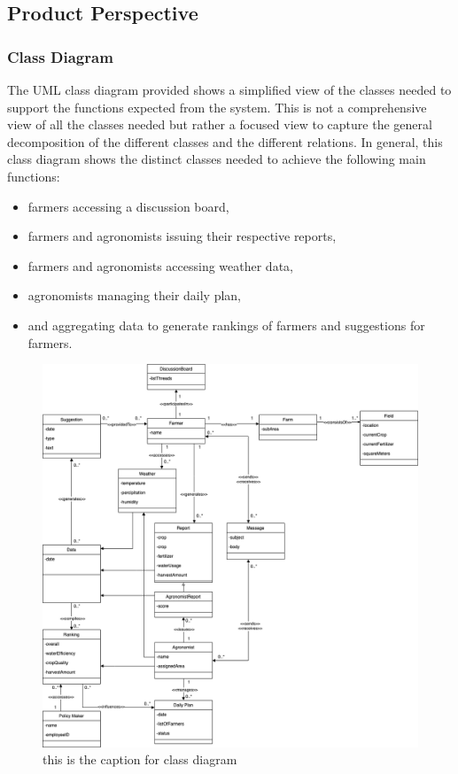 
\subsection{Product Perspective}

\subsubsection{Class Diagram}
The UML class diagram provided shows a simplified view of the classes needed to support the functions expected from the system. This is not a comprehensive view of all the classes needed but rather a focused view to capture the general decomposition of the different classes and the different relations. In general, this class diagram shows the distinct classes needed to achieve the following main functions:
\begin{itemize}
\item farmers accessing a discussion board,
\item farmers and agronomists issuing their respective reports,
\item farmers and agronomists accessing weather data,
\item agronomists managing their daily plan,
\item and aggregating data to generate rankings of farmers and suggestions for farmers. 
\end{itemize} 

\begin{figure}[hbt!]
\centering
\includegraphics[scale=0.35]{../images_diagrams/class_diagram.drawio.png}
\caption{\label{fig:addOne{figure_counter}}this is the caption for class diagram}
\end{figure}
\medskip

